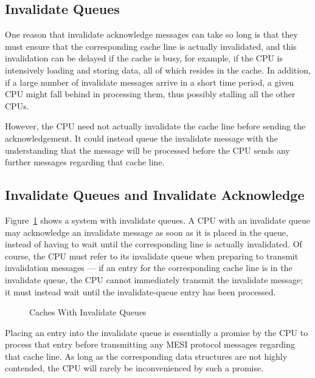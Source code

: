\subsection{Invalidate Queues}
\label{sec:app:whymb:Invalidate Queues}

One reason that invalidate acknowledge messages can take so long
is that they must ensure that the corresponding cache line is
actually invalidated, and this invalidation can be delayed if
the cache is busy, for example, if the CPU is intensively loading
and storing data, all of which resides in the cache.
In addition, if a large number of invalidate messages arrive
in a short time period, a given CPU might fall behind in processing
them, thus possibly stalling all the other CPUs.

However, the CPU need not actually invalidate the cache line
before sending the acknowledgement.
It could instead queue the invalidate message with the understanding
that the message will be processed before the CPU sends any further
messages regarding that cache line.

\subsection{Invalidate Queues and Invalidate Acknowledge}
\label{sec:app:whymb:Invalidate Queues and Invalidate Acknowledge}

Figure~\ref{fig:app:whymb:Caches With Invalidate Queues}
shows a system with invalidate queues.
A CPU with an invalidate queue may acknowledge an invalidate message
as soon as it is placed in the queue, instead of having to wait until
the corresponding line is actually invalidated.
Of course, the CPU must refer to its invalidate queue when preparing
to transmit invalidation messages --- if an entry for the corresponding
cache line is in the invalidate queue, the CPU cannot immediately
transmit the invalidate message; it must instead wait until the
invalidate-queue entry has been processed.

\begin{figure}[htb]
\begin{center}
\end{center}
\caption{Caches With Invalidate Queues}
\label{fig:app:whymb:Caches With Invalidate Queues}
\end{figure}

Placing an entry into the invalidate queue is essentially a promise
by the CPU to process that entry before transmitting any MESI protocol
messages regarding that cache line.
As long as the corresponding data structures are not highly contended,
the CPU will rarely be inconvenienced by such a promise.

